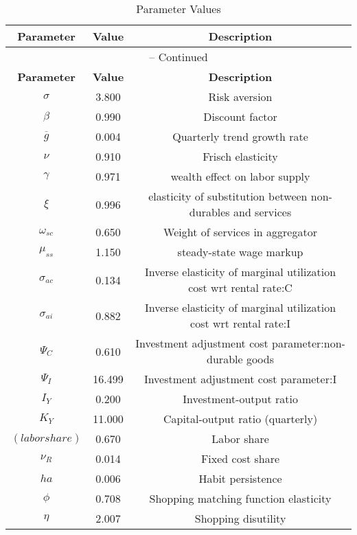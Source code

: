 \begin{center}
\begin{longtable}{ccc}
\caption{Parameter Values}\\%
\toprule%
\multicolumn{1}{c}{\textbf{Parameter}} &
\multicolumn{1}{c}{\textbf{Value}} &
 \multicolumn{1}{c}{\textbf{Description}}\\%
\midrule%
\endfirsthead
\multicolumn{3}{c}{{\tablename} \thetable{} -- Continued}\\%
\midrule%
\multicolumn{1}{c}{\textbf{Parameter}} &
\multicolumn{1}{c}{\textbf{Value}} &
  \multicolumn{1}{c}{\textbf{Description}}\\%
\midrule%
\endhead
${\sigma}$ 	 & 	 3.800 	 & 	 Risk aversion\\
${\beta}$ 	 & 	 0.990 	 & 	 Discount factor\\
${\overline{g}}$ 	 & 	 0.004 	 & 	 Quarterly trend growth rate\\
$\nu$ 	 & 	 0.910 	 & 	 Frisch elasticity\\
$\gamma$ 	 & 	 0.971 	 & 	 wealth effect on labor supply\\
$\xi$ 	 & 	 0.996 	 & 	 elasticity of substitution between non-durables and services\\
$\omega_{sc}$ 	 & 	 0.650 	 & 	 Weight of services in aggregator\\
$\mu_{ss}$ 	 & 	 1.150 	 & 	 steady-state wage markup\\
${\sigma_{ac}}$ 	 & 	 0.134 	 & 	 Inverse elasticity of marginal utilization cost wrt rental rate:C\\
${\sigma_{ai}}$ 	 & 	 0.882 	 & 	 Inverse elasticity of marginal utilization cost wrt rental rate:I\\
${\Psi_{C}}$ 	 & 	 0.610 	 & 	 Investment adjustment cost parameter:non-durable goods\\
${\Psi_I}$ 	 & 	 16.499 	 & 	 Investment adjustment cost parameter:I\\
${I_Y}$ 	 & 	 0.200 	 & 	 Investment-output ratio\\
${K_Y}$ 	 & 	 11.000 	 & 	 Capital-output ratio (quarterly)\\
$(labor share)$ 	 & 	 0.670 	 & 	 Labor share\\
${\nu_R}$ 	 & 	 0.014 	 & 	 Fixed cost share\\
${ha}$ 	 & 	 0.006 	 & 	 Habit persistence\\
${\phi}$ 	 & 	 0.708 	 & 	 Shopping matching function elasticity\\
${\eta}$ 	 & 	 2.007 	 & 	 Shopping disutility\\

\end{longtable}
\end{center}
